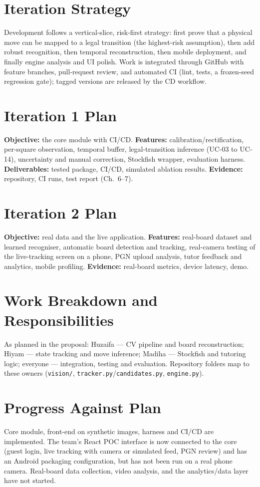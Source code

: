 \section{Iteration Strategy}
Development follows a vertical-slice, risk-first strategy: first prove that a physical move can be mapped to a legal
transition (the highest-risk assumption), then add robust recognition, then temporal reconstruction, then mobile
deployment, and finally engine analysis and UI polish. Work is integrated through GitHub with feature branches,
pull-request review, and automated CI (lint, tests, a frozen-seed regression gate); tagged versions are released
by the CD workflow.

\section{Iteration 1 Plan}\label{sec:iter1}
\textbf{Objective:} the core module with CI/CD. \textbf{Features:} calibration/rectification, per-square observation,
temporal buffer, legal-transition inference (UC-03 to UC-14), uncertainty and manual correction, Stockfish
wrapper, evaluation harness. \textbf{Deliverables:} tested package, CI/CD, simulated ablation results.
\textbf{Evidence:} repository, CI runs, test report (Ch.~6--7).

\section{Iteration 2 Plan}\label{sec:iter2}
\textbf{Objective:} real data and the live application. \textbf{Features:} real-board dataset and learned recogniser,
automatic board detection and tracking, real-camera testing of the live-tracking screen on a phone, PGN upload analysis, tutor
feedback and analytics, mobile profiling. \textbf{Evidence:} real-board metrics, device latency, demo.

\section{Work Breakdown and Responsibilities}
As planned in the proposal: Huzaifa --- CV pipeline and board reconstruction; Hiyam --- state tracking and move
inference; Madiha --- Stockfish and tutoring logic; everyone --- integration, testing and evaluation. Repository
folders map to these owners (\texttt{vision/}, \texttt{tracker.py}/\texttt{candidates.py}, \texttt{engine.py}).

\section{Progress Against Plan}
Core module, front-end on synthetic images, harness and CI/CD are implemented. The team's React POC interface is now connected to the core (guest login, live tracking with camera or simulated feed,
PGN review) and has an Android packaging configuration, but has not been run on a real phone camera. Real-board
data collection, video analysis, and the analytics/data layer have not started.

